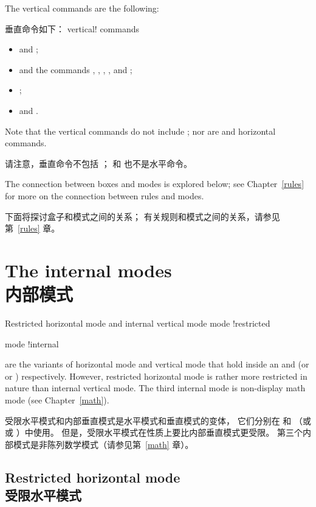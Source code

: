 The vertical commands are the following:

垂直命令如下：
\label{v:com:list}\term vertical! commands\par
\begin{itemize}
\item {} and ;
\item {} and the  commands
 , , , , and ;
\item {};
\item {} and .
\end{itemize}
Note that the vertical commands do not include ;
nor are  and  horizontal commands.

请注意，垂直命令不包括 ；
 和  也不是水平命令。


The connection between boxes and modes is explored below;
see Chapter~\ref{rules} for more on the connection between
rules and modes.

下面将探讨盒子和模式之间的关系；
有关规则和模式之间的关系，请参见第~\ref{rules} 章。



\section{The internal modes\\内部模式}

Restricted horizontal mode and internal vertical mode
\term mode !restricted\par\term mode !internal\par
are the variants of horizontal mode and vertical mode
that hold inside an  and  (or 
or ) respectively.
However, restricted horizontal mode is rather more
restricted in nature than internal vertical mode.
The third internal mode is non-display math mode
(see Chapter~\ref{math}).

受限水平模式和内部垂直模式是水平模式和垂直模式的变体，
它们分别在  和 （或  或 ）中使用。
但是，受限水平模式在性质上要比内部垂直模式更受限。
第三个内部模式是非陈列数学模式（请参见第~\ref{math} 章）。

\subsection{Restricted horizontal mode\\受限水平模式}

